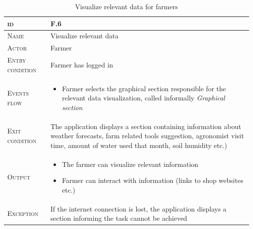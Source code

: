 \begin{table}[H]
    \centering
    \begin{tabular}{|l|p{}|}
        \hline %
    	\textsc{id}                 &   F.6\\
    	\hline %
    	\textsc{Name}               &   Visualize relevant data\\
    	\hline %
    	\textsc{Actor}             &   Farmer\\
    	\hline %
    	\textsc{Entry condition}   &   Farmer has logged in\\
    	\hline %
    	\textsc{Events flow}         &   %
            	                        \begin{itemize}
                                    	    \item Farmer selects the graphical section responsible for the relevant data visualization, called informally \textit{Graphical section}
                                        \end{itemize}\\
        \hline %
        \textsc{Exit condition}    &  The application displays a section containing information about weather forecasts, farm related tools suggestion, agronomist visit time, amount of water used that month, soil humidity etc.)\\
    	\hline %
    	\textsc{Output}             &  \begin{itemize}
    	    \item The farmer can visualize relevant information
    	    \item Farmer can interact with information (links to shop websites etc.)
    	\end{itemize}\\
    	\hline %
    	\textsc{Exception}         &   If the internet connection is lost, the application displays a section informing the task cannot be achieved\\
    	\hline %
        
    \end{tabular}

\caption{\label{tab:visualize_relevant_data}Visualize relevant data for farmers}
\end{table}

